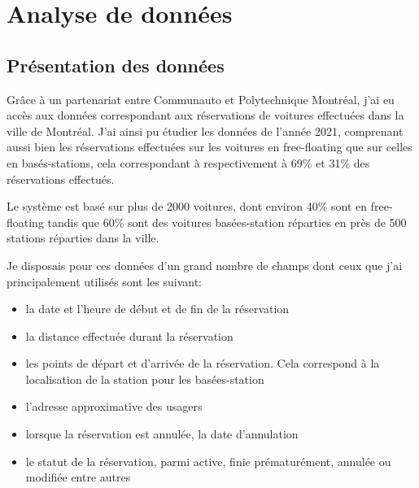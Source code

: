 \documentclass[12pt,a4paper]{article}
\newcommand{\1}[1]{\mathbbm{1}_{\{#1\}} }
\theoremstyle{definition}
\begin{document}
\section{Analyse de données}
\subsection{Présentation des données}

Grâce à un partenariat entre Communauto et Polytechnique Montréal, j'ai eu accès aux données correspondant aux réservations de voitures effectuées dans la ville de Montréal. 
J'ai ainsi pu étudier les données de l'année 2021, comprenant  aussi bien les réservations effectuées sur les voitures en free-floating que sur celles en basés-stations, cela correspondant à respectivement à 69\% et 31\% des réservations effectués.


Le système est basé sur plus de 2000 voitures, dont environ 40\% sont en free-floating tandis que 60\% sont des voitures basées-station réparties en près de 500 stations réparties dans la ville.

Je disposais pour ces données d'un grand nombre de champs dont ceux que j'ai principalement utilisés sont les suivant:
\begin{itemize}
\item la date et l'heure de début et de fin de la réservation
\item la distance effectuée durant la réservation
\item les points de départ et d'arrivée de la réservation. Cela correspond à la localisation de la station pour les basées-station
\item l'adresse approximative des usagers
\item lorsque la réservation est annulée, la date d'annulation
\item le statut de la réservation, parmi active, finie prématurément, annulée ou modifiée entre autres
\end{itemize}
\end{document}
